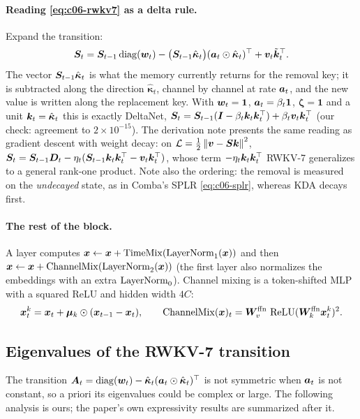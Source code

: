 \paragraph{Reading \eqref{eq:c06-rwkv7} as a delta rule.}
Expand the transition:
\begin{equation}\label{eq:c06-rwkv-expanded}
  \bm{S}_t=\bm{S}_{t-1}\operatorname{diag}(\bm{w}_t)-\big(\bm{S}_{t-1}\hat{\bm\kappa}_t\big)(\bm{a}_t\odot\hat{\bm\kappa}_t)^{\top}+\bm{v}_t\tilde{\bm{k}}_t^{\top} .
\end{equation}
The vector $\bm{S}_{t-1}\hat{\bm\kappa}_t$ is what the memory currently returns for the
removal key; it is subtracted along the direction $\hat{\bm\kappa}_t$, channel by channel at
rate $\bm{a}_t$, and the new value is written along the replacement key. With $\bm{w}_t=\bm1$,
$\bm{a}_t=\beta_t\bm1$, $\bm\zeta=\bm1$ and a unit $\bm{k}_t=\hat{\bm\kappa}_t$ this is exactly
DeltaNet, $\bm{S}_t=\bm{S}_{t-1}(\bm{I}-\beta_t\bm{k}_t\bm{k}_t^{\top})+\beta_t\bm{v}_t\bm{k}_t^{\top}$ (our check: agreement
to $2\times10^{-15}$). The \fla{} derivation note
 presents the
same reading as gradient descent with weight decay: on $\mathcal{L}=\tfrac12\left\lVert \bm{v}-\bm{S}\bm{k}\right\rVert^2$,
$\bm{S}_t=\bm{S}_{t-1}\bm{D}_t-\eta_t(\bm{S}_{t-1}\bm{k}_t\bm{k}_t^{\top}-\bm{v}_t\bm{k}_t^{\top})$, whose term
$-\eta_t\bm{k}_t\bm{k}_t^{\top}$ RWKV-7 generalizes to a general rank-one product. Note also the
ordering: the removal is measured on the \emph{undecayed} state, as in Comba's SPLR
\eqref{eq:c06-splr}, whereas KDA decays first.

\paragraph{The rest of the block.} A layer computes
$\bm{x}\gets\bm{x}+\mathrm{TimeMix}(\operatorname{LayerNorm}_1(\bm{x}))$ and then
$\bm{x}\gets\bm{x}+\mathrm{ChannelMix}(\operatorname{LayerNorm}_2(\bm{x}))$ (the first layer also normalizes the
embeddings with an extra $\operatorname{LayerNorm}_0$). Channel mixing is a token-shifted MLP with a squared
ReLU and hidden width $4C$:
\begin{equation}\label{eq:c06-cmix}
  \bm{x}^k_t=\bm{x}_t+\bm\mu_k\odot(\bm{x}_{t-1}-\bm{x}_t),\qquad
  \mathrm{ChannelMix}(\bm{x})_t=\bm{W}^{\text{ffn}}_v\,\operatorname{ReLU}(\bm{W}^{\text{ffn}}_k\bm{x}^k_t)^2 .
\end{equation}

\subsection{Eigenvalues of the RWKV-7 transition}\label{sec:c06-rwkv-eig}

The transition $\bm{A}_t=\operatorname{diag}(\bm{w}_t)-\hat{\bm\kappa}_t(\bm{a}_t\odot\hat{\bm\kappa}_t)^{\top}$ is not
symmetric when $\bm{a}_t$ is not constant, so a priori its eigenvalues could be complex or
large. The following analysis is ours; the paper's own expressivity results are summarized
after it.


